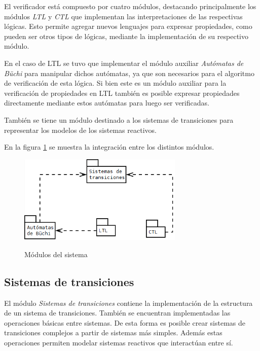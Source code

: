 El verificador está compuesto por cuatro módulos, destacando principalmente los módulos
 \textit{LTL} y \textit{CTL} que implementan las interpretaciones  de las respectivas
 lógicas.
Esto permite agregar nuevos lenguajes para expresar propiedades, como pueden ser otros tipos
 de lógicas, mediante la implementación de su respectivo módulo.

En el caso de LTL se tuvo que implementar el módulo auxiliar \textit{Autómatas de Büchi}
 para manipular dichos autómatas, ya que son necesarios para el algoritmo de verificación
 de esta lógica.
Si bien este es un módulo auxiliar para la verificación de propiedades en LTL también
 es posible expresar propiedades directamente mediante estos autómatas para luego ser
 verificadas.

También se tiene un módulo destinado a los sistemas de transiciones para representar los
 modelos de los sistemas reactivos.

En la figura \ref{fig:paquetes} se muestra la integración entre los distintos módulos.

\begin{figure}[hbtp]
\begin{center}
\caption{Módulos del sistema}
\includegraphics[width=0.7\textwidth]{mc/imagenes/paquetes.png}
\label{fig:paquetes}
\end{center}
\end{figure}


\subsection{Sistemas de transiciones}
El módulo \textit{Sistemas de transiciones} contiene la implementación de la estructura
 de un sistema de transiciones.
También se encuentran implementadas las operaciones básicas entre sistemas. De esta forma
 es posible crear sistemas de transiciones complejos a partir de sistemas más simples.
Además estas operaciones permiten modelar sistemas reactivos que interactúan entre sí.


